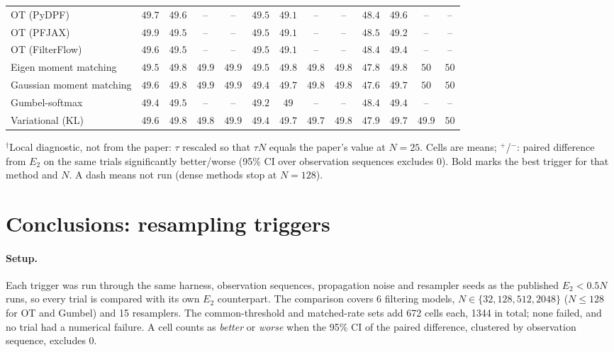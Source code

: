 \begin{table}[ht]
\begin{adjustbox}{max width=\linewidth}
\begin{tabular}{lcccc|cccc|cccc}
OT (PyDPF) & $49.7$ & $49.6$ & -- & -- & $49.5$ & $49.1$ & -- & -- & $48.4$ & $49.6$ & -- & -- \\
OT (PFJAX) & $49.9$ & $49.5$ & -- & -- & $49.5$ & $49.1$ & -- & -- & $48.5$ & $49.2$ & -- & -- \\
OT (FilterFlow) & $49.6$ & $49.5$ & -- & -- & $49.5$ & $49.1$ & -- & -- & $48.4$ & $49.4$ & -- & -- \\
Eigen moment matching & $49.5$ & $49.8$ & $49.9$ & $49.9$ & $49.5$ & $49.8$ & $49.8$ & $49.8$ & $47.8$ & $49.8$ & $50$ & $50$ \\
Gaussian moment matching & $49.6$ & $49.8$ & $49.9$ & $49.9$ & $49.4$ & $49.7$ & $49.8$ & $49.8$ & $47.6$ & $49.7$ & $50$ & $50$ \\
Gumbel-softmax & $49.4$ & $49.5$ & -- & -- & $49.2$ & $49$ & -- & -- & $48.4$ & $49.4$ & -- & -- \\
Variational (KL) & $49.6$ & $49.8$ & $49.8$ & $49.9$ & $49.4$ & $49.7$ & $49.7$ & $49.8$ & $47.9$ & $49.7$ & $49.9$ & $50$ \\
\bottomrule
\end{tabular}
\end{adjustbox}
\par\smallskip\parbox{0.95\linewidth}{\footnotesize $^\dagger$Local diagnostic, not from the paper: $\tau$ rescaled so that $\tau N$ equals the paper's value at $N{=}25$. Cells are means; $^{+}$/$^{-}$: paired difference from $E_2$ on the same trials significantly better/worse (95\% CI over observation sequences excludes 0). Bold marks the best trigger for that method and $N$. A dash means not run (dense methods stop at $N{=}128$).}
\end{table}

\clearpage
\section*{Conclusions: resampling triggers}

\paragraph{Setup.} Each trigger was run through the same harness, observation sequences, propagation noise and resampler seeds as the published $E_2<0.5N$ runs, so every trial is compared with its own $E_2$ counterpart. The comparison covers 6 filtering models, $N\in\{32,128,512,2048\}$ ($N\le128$ for OT and Gumbel) and 15 resamplers. The common-threshold and matched-rate sets add 672 cells each, 1344 in total; none failed, and no trial had a numerical failure. A cell counts as \emph{better} or \emph{worse} when the 95\% CI of the paired difference, clustered by observation sequence, excludes 0.

